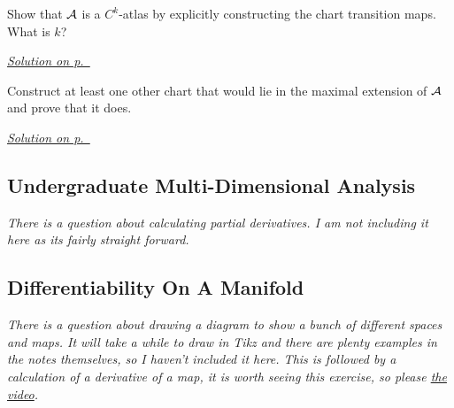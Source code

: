 \begin{exercise}\label{ex:diffmfds-5}
Show that $\mathcal{A}$ is a $C^k$-atlas by explicitly constructing the chart transition maps. What is $k$?
\end{exercise}
\hyperref[sol:diffmfds-5]{\small \textit{Solution on p.~\pageref*{sol:diffmfds-5}}}

\begin{exercise}\label{ex:diffmfds-6}
Construct at least one other chart that would lie in the maximal extension of $\mathcal{A}$ and prove that it does.
\end{exercise}
\hyperref[sol:diffmfds-6]{\small \textit{Solution on p.~\pageref*{sol:diffmfds-6}}}

\subsection{Undergraduate Multi-Dimensional Analysis}

\textit{There is a question about calculating partial derivatives. I am not including it here as its fairly straight forward.}

\subsection{Differentiability On A Manifold}

\textit{There is a question about drawing a diagram to show a bunch of different spaces and maps. It will take a while to draw in Tikz and there are plenty examples in the notes themselves, so I haven't included it here. This is followed by a calculation of a derivative of a map, it is worth seeing this exercise, so please \href{https://www.youtube.com/watch?v=FXPdKxOq1KA&list=PLFeEvEPtX_0RQ1ys-7VIsKlBWz7RX-FaL&index=4}{the video}.}
